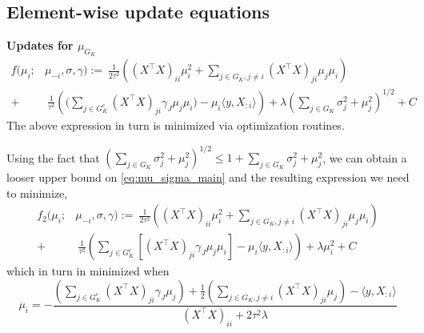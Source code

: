 \documentclass[12pt]{article}
\begin{document}
\subsection{Element-wise update equations}

\textbf{Updates for $\mu_{G_K}$}
\begin{equation} \label{eq:mu_update}
\begin{aligned}
    f(\mu_i; & \mu_{-i}, \sigma, \gamma) :=\
    \frac{1}{2\tau^2} \left(
	(X^\top X)_{ii} \mu_i^2 + 
	\sum_{j \in G_K, j\neq i} (X^\top X)_{ji} \mu_j \mu_i
    \right) \\
+ &\
    \frac{1}{\tau^2} \left(
	\bigg( \sum_{j \in G_K^c} (X^\top X)_{ji} \gamma_{J} \mu_j \mu_i \bigg) -
	\mu_i \langle y, X_{:i} \rangle   
    \right)
+
    \lambda \left( \sum_{j \in G_K} 
	\sigma_j^2 + \mu_j^2
    \right)^{1/2} + C
\end{aligned}
\end{equation}
The above expression in turn is minimized via optimization routines.

Using the fact that $ \left( \sum_{j \in G_K} \sigma_j^2 + \mu_j^2 \right)^{1/2} \leq 1 + \sum_{j \in G_K} \sigma_j^2 + \mu_j^2 $, we can obtain a looser upper bound on \eqref{eq:mu_sigma_main} and the resulting expression we need to minimize,
\begin{equation}
\begin{aligned}
    f_2(\mu_i; & \mu_{-i}, \sigma, \gamma) :=\
    \frac{1}{2\tau^2} \left(
	(X^\top X)_{ii} \mu_i^2 + 
	\sum_{j \in G_K, j\neq i} (X^\top X)_{ji} \mu_j \mu_i
    \right) \\
+ &\
    \frac{1}{\tau^2} \left(
	\sum_{j \in G_K^c} \left[ (X^\top X)_{ji} \gamma_{J} \mu_j \mu_i \right] -
	\mu_i \langle y, X_{:i} \rangle   
    \right)
+
    \lambda \mu_i^2 + C
\end{aligned}
\end{equation}
which in turn in minimized when
\begin{equation} \label{eq:mu_analytic}
    \mu_i =
    - \frac{
	\left(\sum_{j \in G_K^c} (X^\top X)_{ji} \gamma_{J} \mu_j \right) +
	\frac{1}{2} \left(\sum_{j \in G_K, j\neq i} (X^\top X)_{ji} \mu_j \right)-
	\langle y, X_{:i} \rangle 
    }{
	(X^\top X)_{ii} +
	2 \tau^2 \lambda 
    }
\end{equation}
\end{document}
